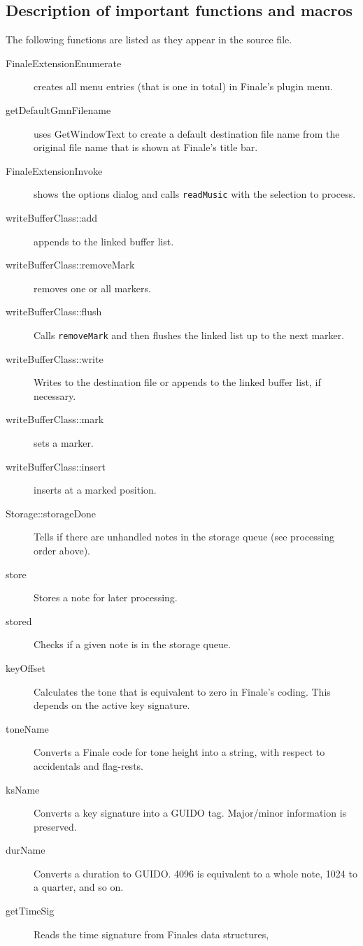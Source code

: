\documentclass{article}
\begin{document}
\subsection{Description of important functions and macros}
The following functions are listed as they appear in the source file.
\begin{description}
\item[FinaleExtensionEnumerate] creates all menu entries (that is one in total)
in Finale's plugin menu.
\item[getDefaultGmnFilename] uses GetWindowText to create a default destination
file name from the original file name that is shown at Finale's title bar.
\item[FinaleExtensionInvoke] shows the options dialog and calls
\verb"readMusic" with the selection to process.
\item[writeBufferClass::add] appends to the linked buffer list.
\item[writeBufferClass::removeMark] removes one or all markers.
\item[writeBufferClass::flush] Calls \verb"removeMark" and then flushes the linked list up
to the next marker.
\item[writeBufferClass::write] Writes to the destination file or appends to the linked buffer
list, if necessary.
\item[writeBufferClass::mark] sets a marker.
\item[writeBufferClass::insert] inserts at a marked position.
\item[Storage::storageDone] Tells if there are unhandled notes in the
storage queue (see processing order above).
\item[store] Stores a note for later processing.
\item[stored] Checks if a given note is in the storage queue.
\item[keyOffset] Calculates the tone that is equivalent to zero in Finale's
coding. This depends on the active key signature.
\item[toneName] Converts a Finale code for tone height into a string, with
respect to accidentals and flag-rests.
\item[ksName] Converts a key signature into a GUIDO tag. Major/minor information
is preserved.
\item[durName] Converts a duration to GUIDO. 4096 is equivalent to a whole note,
1024 to a quarter, and so on.
\item[getTimeSig] Reads the time signature from Finales data structures,

\end{description}
\end{document}
